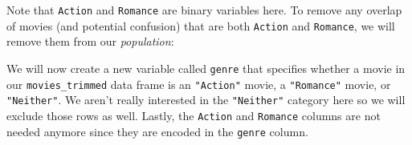\documentclass[12pt, krantz2,]{krantz}
\makeatletter
\newenvironment{Shaded}{\begin{snugshade}}{\end{snugshade}}
\newcommand{\DataTypeTok}[1]{\textcolor[rgb]{0.27,0.27,0.27}{#1}}
\newcommand{\DecValTok}[1]{\textcolor[rgb]{0.06,0.06,0.06}{#1}}
\newcommand{\KeywordTok}[1]{\textcolor[rgb]{0.27,0.27,0.27}{\textbf{#1}}}
\newcommand{\NormalTok}[1]{#1}
\newcommand{\OperatorTok}[1]{\textcolor[rgb]{0.43,0.43,0.43}{\textbf{#1}}}
\newcommand{\OtherTok}[1]{\textcolor[rgb]{0.37,0.37,0.37}{#1}}
\newcommand{\StringTok}[1]{\textcolor[rgb]{0.5,0.5,0.5}{#1}}
\newenvironment{kframe}{%
\medskip{}
\setlength{\fboxsep}{.8em}
 \def\at@end@of@kframe{}%
 \ifinner\ifhmode%
  \def\at@end@of@kframe{\end{minipage}}%
  \begin{minipage}{\columnwidth}%
 \fi\fi%
 \def\FrameCommand##1{\hskip\@totalleftmargin \hskip-\fboxsep
 \colorbox{shadecolor}{##1}\hskip-\fboxsep
     \hskip-\linewidth \hskip-\@totalleftmargin \hskip\columnwidth}%
 \MakeFramed {\advance\hsize-\width
   \@totalleftmargin\z@ \linewidth\hsize
   \@setminipage}}%
 {\par\unskip\endMakeFramed%
 \at@end@of@kframe}
\renewenvironment{Shaded}{\begin{kframe}}{\end{kframe}}
\makeatother
\begin{document}
\begin{Shaded}
\end{Shaded}

Note that \texttt{Action} and \texttt{Romance} are binary variables here. To remove any overlap of movies (and potential confusion) that are both \texttt{Action} and \texttt{Romance}, we will remove them from our \emph{population}:

\begin{Shaded}
\end{Shaded}

We will now create a new variable called \texttt{genre} that specifies whether a movie in our \texttt{movies\_trimmed} data frame is an \texttt{"Action"} movie, a \texttt{"Romance"} movie, or \texttt{"Neither"}. We aren't really interested in the \texttt{"Neither"} category here so we will exclude those rows as well. Lastly, the \texttt{Action} and \texttt{Romance} columns are not needed anymore since they are encoded in the \texttt{genre} column.

\begin{Shaded}
\end{Shaded}
\end{document}
